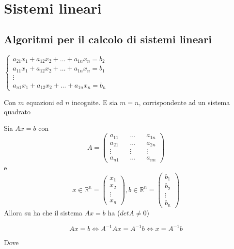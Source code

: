 \chapter{Sistemi lineari}

\section{Algoritmi per il calcolo di sistemi lineari}
\begin{center}
    \begin{math}
        \begin{cases}
            a_{21}x_1+ a_{12}x_2 +\dots + a_{1n}x_n = b_2\\
            a_{11}x_1+ a_{12}x_2 +\dots + a_{1n}x_n = b_1\\
            \vdots \\
            a_{n1}x_1+ a_{12}x_2 +\dots + a_{1n}x_n = b_n
        \end{cases}
    \end{math}
\end{center}

Con $m$ equazioni ed $n$ incognite. E sia $m=n$, corrispondente ad un sistema quadrato

Sia $Ax= b$ con
\[
    A = \begin{pmatrix}
        a_{11} && \dots && a_{1n} \\
        a_{21} && \dots && a_{2n} \\ 
        \vdots && \vdots && \vdots \\
        a_{n1} && \dots && a_{nn}
    \end{pmatrix}
\]
e 
\[
    x \in \mathbb{R}^n =\begin{pmatrix}
        x_1 \\
        x_2 \\
        \vdots \\
        x_n
    \end{pmatrix},
    b \in \mathbb{R}^n = \begin{pmatrix}
        b_1 \\
        b_2 \\
        \vdots \\
        b_n
    \end{pmatrix}
\]
Allora su ha che il sistema $Ax=b$ ha  ($detA\neq 0$)

\[
    Ax = b \iff A^{-1}Ax = A^{-1} b \iff x =A^{-1}b    
\]

Dove 

